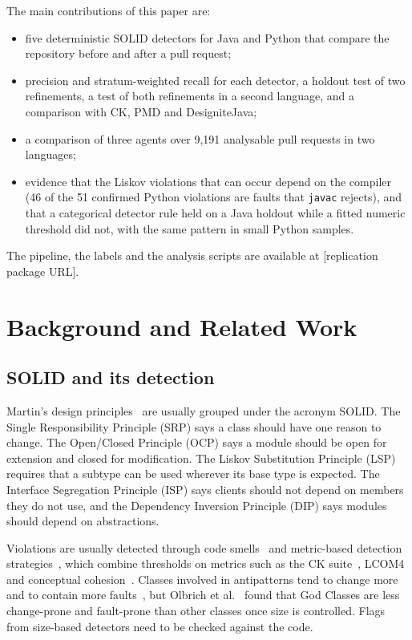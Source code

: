 \documentclass[sigconf]{acmart}
\begin{document}
The main contributions of this paper are:
\begin{itemize}
\item five deterministic SOLID detectors for Java and Python that compare the repository before and
after a pull request;
\item precision and stratum-weighted recall for each detector, a holdout test of two refinements, a
test of both refinements in a second language, and a comparison with CK, PMD and DesigniteJava;
\item a comparison of three agents over 9,191 analysable pull requests in two languages;
\item evidence that the Liskov violations that can occur depend on the compiler (46 of the 51
confirmed Python violations are faults that \texttt{javac} rejects), and that a categorical detector
rule held on a Java holdout while a fitted numeric threshold did not, with the same pattern in small
Python samples.
\end{itemize}

The pipeline, the labels and the analysis scripts are available at [replication package URL].

\section{Background and Related Work}
\label{sec:related}

\subsection{SOLID and its detection}

Martin's design principles~\cite{martin2000solid,martin2003agile} are usually grouped under the
acronym SOLID. The Single Responsibility Principle (SRP) says a class should have one reason to
change. The Open/Closed Principle (OCP) says a module should be open for extension and closed for
modification. The Liskov Substitution Principle (LSP) requires that a subtype can be used wherever
its base type is expected. The Interface Segregation Principle (ISP) says clients should not depend
on members they do not use, and the Dependency Inversion Principle (DIP) says modules should depend on
abstractions.

Violations are usually detected through code smells~\cite{fowler1999refactoring,suryanarayana2014smells}
and metric-based detection strategies~\cite{marinescu2004detection}, which combine thresholds on
metrics such as the CK suite~\cite{chidamber1994metrics}, LCOM4~\cite{hitz1995cohesion} and
conceptual cohesion~\cite{marcus2008c3}. Classes involved in antipatterns tend to change more and to
contain more faults~\cite{khomh2012antipatterns}, but Olbrich et al.~\cite{olbrich2010godclass}
found that God Classes are less change-prone and fault-prone than other classes once size is
controlled. Flags from size-based detectors need to be checked against the code.
\end{document}
